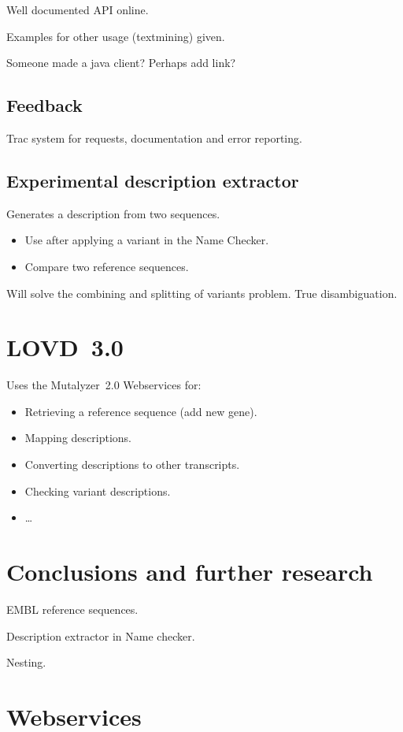 \documentclass{article}
\begin{document}
Well documented API online.

Examples for other usage (textmining) given.

Someone made a java client? Perhaps add link?

\subsection{Feedback}
Trac system for requests, documentation and error reporting.

\subsection{Experimental description extractor}
Generates a description from two sequences.
\begin{itemize}
  \item Use after applying a variant in the Name Checker.
  \item Compare two reference sequences.
\end{itemize}

Will solve the combining and splitting of variants problem. True
disambiguation.

\section{LOVD~3.0}
Uses the Mutalyzer~2.0 Webservices for:
\begin{itemize}
  \item Retrieving a reference sequence (add new gene).
  \item Mapping descriptions.
  \item Converting descriptions to other transcripts.
  \item Checking variant descriptions.
  \item \ldots
\end{itemize}

\section{Conclusions and further research}\label{conclusion}
EMBL reference sequences.

Description extractor in Name checker.

Nesting.

{}


\appendix

\section{Webservices}

\end{document}
